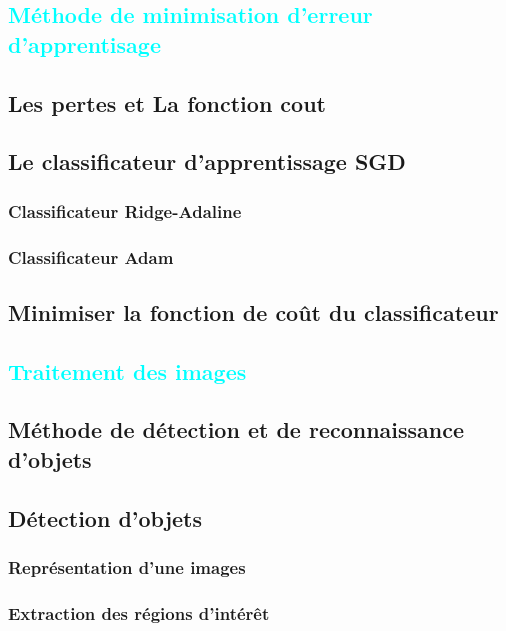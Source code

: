
\textcolor{cyan}{\chapter{Méthode de minimisation d'erreur d'apprentisage}}
\section{Les pertes et La fonction cout}
\lipsum[1]
\section{Le classificateur d'apprentissage SGD}
\subsection{Classificateur Ridge-Adaline}
\lipsum[1]
\subsection{Classificateur Adam}
\lipsum[1]

\section{Minimiser la fonction de coût du classificateur}
\lipsum[1]
\lipsum[2]


\textcolor{cyan}{\chapter{Traitement des images}}

\section{Méthode de détection et de reconnaissance d'objets}
\lipsum[1]

\section{Détection d'objets }
\subsection{Représentation d'une images}
\lipsum[1]
\lipsum[2]

\subsection{Extraction des régions d'intérêt}
\lipsum[1]

